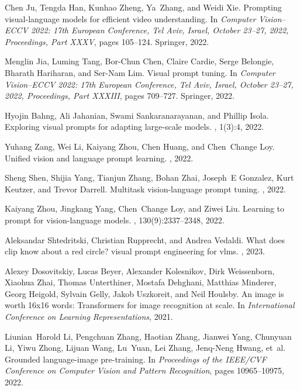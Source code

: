 \documentclass{article}
\begin{document}
{\begin{thebibliography}{10}
Chen Ju, Tengda Han, Kunhao Zheng, Ya~Zhang, and Weidi Xie.
\newblock Prompting visual-language models for efficient video understanding.
\newblock In {\em Computer Vision--ECCV 2022: 17th European Conference, Tel
  Aviv, Israel, October 23--27, 2022, Proceedings, Part XXXV}, pages 105--124.
  Springer, 2022.

Menglin Jia, Luming Tang, Bor-Chun Chen, Claire Cardie, Serge Belongie, Bharath
  Hariharan, and Ser-Nam Lim.
\newblock Visual prompt tuning.
\newblock In {\em Computer Vision--ECCV 2022: 17th European Conference, Tel
  Aviv, Israel, October 23--27, 2022, Proceedings, Part XXXIII}, pages
  709--727. Springer, 2022.

Hyojin Bahng, Ali Jahanian, Swami Sankaranarayanan, and Phillip Isola.
\newblock Exploring visual prompts for adapting large-scale models.
, 1(3):4, 2022.

Yuhang Zang, Wei Li, Kaiyang Zhou, Chen Huang, and Chen~Change Loy.
\newblock Unified vision and language prompt learning.
, 2022.

Sheng Shen, Shijia Yang, Tianjun Zhang, Bohan Zhai, Joseph~E Gonzalez, Kurt
  Keutzer, and Trevor Darrell.
\newblock Multitask vision-language prompt tuning.
, 2022.

Kaiyang Zhou, Jingkang Yang, Chen~Change Loy, and Ziwei Liu.
\newblock Learning to prompt for vision-language models.
, 130(9):2337--2348, 2022.

Aleksandar Shtedritski, Christian Rupprecht, and Andrea Vedaldi.
\newblock What does clip know about a red circle? visual prompt engineering for
  vlms.
, 2023.

Alexey Dosovitskiy, Lucas Beyer, Alexander Kolesnikov, Dirk Weissenborn,
  Xiaohua Zhai, Thomas Unterthiner, Mostafa Dehghani, Matthias Minderer, Georg
  Heigold, Sylvain Gelly, Jakob Uszkoreit, and Neil Houlsby.
\newblock An image is worth 16x16 words: Transformers for image recognition at
  scale.
\newblock In {\em International Conference on Learning Representations}, 2021.

Liunian~Harold Li, Pengchuan Zhang, Haotian Zhang, Jianwei Yang, Chunyuan Li,
  Yiwu Zhong, Lijuan Wang, Lu~Yuan, Lei Zhang, Jenq-Neng Hwang, et~al.
\newblock Grounded language-image pre-training.
\newblock In {\em Proceedings of the IEEE/CVF Conference on Computer Vision and
  Pattern Recognition}, pages 10965--10975, 2022.


\end{thebibliography}}
\end{document}
